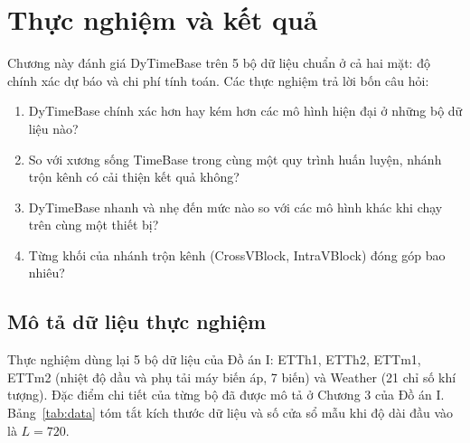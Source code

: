 \documentclass[12pt,a4paper]{report}
\numberwithin{equation}{chapter}
\begin{document}
\chapter{Thực nghiệm và kết quả}

Chương này đánh giá DyTimeBase trên 5 bộ dữ liệu chuẩn ở cả hai mặt: độ chính xác dự báo và chi phí tính toán. Các thực
nghiệm trả lời bốn câu hỏi:
\begin{enumerate}
  \item DyTimeBase chính xác hơn hay kém hơn các mô hình hiện đại ở những bộ dữ liệu nào?
  \item So với xương sống TimeBase trong cùng một quy trình huấn luyện, nhánh trộn kênh có cải thiện kết quả không?
  \item DyTimeBase nhanh và nhẹ đến mức nào so với các mô hình khác khi chạy trên cùng một thiết bị?
  \item Từng khối của nhánh trộn kênh (CrossVBlock, IntraVBlock) đóng góp bao nhiêu?
\end{enumerate}

\section{Mô tả dữ liệu thực nghiệm}

Thực nghiệm dùng lại 5 bộ dữ liệu của Đồ án I: ETTh1, ETTh2, ETTm1, ETTm2 (nhiệt độ dầu và phụ tải máy biến áp, 7 biến)
và Weather (21 chỉ số khí tượng). Đặc điểm chi tiết của từng bộ đã được mô tả ở Chương 3 của Đồ án I. Bảng~\ref{tab:data}
tóm tắt kích thước dữ liệu và số cửa sổ mẫu khi độ dài đầu vào là $L=720$.

\begin{table}[H]
\centering
\caption{Thống kê các bộ dữ liệu. Số cửa sổ tính với $L=720$, $S=96$ (huấn luyện / kiểm định / kiểm thử).}
\label{tab:data}
\small
{}
\end{table}
\end{document}

